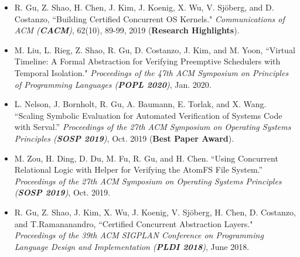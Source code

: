 \documentclass[10pt]{article}
\newenvironment{innerlist}[1][\enskip\textbullet]%
        {\begin{itemize}[#1,leftmargin=25pt,parsep=0pt,itemsep=2pt,topsep=2pt,partopsep=0pt]}
        {\end{itemize}}
\begin{document}
\begin{innerlist}
%
%
%
\item[] R. Gu, Z. Shao, H. Chen, J. Kim, J. Koenig, X. Wu, V. Sj\"{o}berg, and D. Costanzo, ``Building Certified Concurrent OS Kernels." \emph{Communications of ACM (\textbf{CACM})}, 62(10), 89-99, 2019  (\textbf{Research Highlights}).

\vspace{.1in}

\item[] M. Liu, L. Rieg, Z. Shao, R. Gu, D. Costanzo, J. Kim, and M. Yoon, ``Virtual Timeline: A Formal Abstraction for Verifying Preemptive Schedulers with Temporal Isolation." \emph{Proceedings of the 47th ACM Symposium on Principles of Programming Languages (\textbf{POPL 2020})}, Jan. 2020.

\vspace{.1in}

\item[]  L. Nelson, J. Bornholt, R. Gu, A. Baumann, E. Torlak, and X. Wang. ``Scaling Symbolic Evaluation for Automated Verification of Systems Code with Serval.'' \emph{Proceedings of the 27th ACM Symposium on Operating Systems Principles (\textbf{SOSP 2019})}, 
              Oct. 2019 (\textbf{Best Paper Award}).    
            
\vspace{.1in}

\item[]  M. Zou, H. Ding, D. Du, M. Fu, R. Gu, and H. Chen. ``Using Concurrent Relational Logic with Helper for Verifying the AtomFS File System.'' \emph{Proceedings of the 27th ACM Symposium on Operating Systems Principles (\textbf{SOSP 2019})}, Oct. 2019.
           
\vspace{.1in}




\item[] R. Gu, Z. Shao, J. Kim, X. Wu, J. Koenig, V. Sj\"{o}berg, H. Chen, D. Costanzo, and T.Ramananandro, ``Certified Concurrent Abstraction Layers." \emph{Proceedings of the 39th ACM SIGPLAN Conference on Programming Language Design and Implementation (\textbf{PLDI 2018})}, June 2018.


\end{innerlist}
\end{document}
